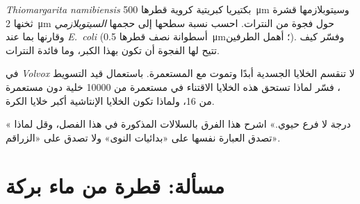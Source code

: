 \begin{exercise}[$\star\star\star$]\label{exo:b2:unicellular-diversity:10}
\emph{Thiomargarita namibiensis} بكتيريا كبريتية كروية قطرها
\qty{500}{\micro m} وسيتوبلازمها قشرة ثخنها \qty{2}{\micro m} حول
فجوة من النترات. احسب نسبة سطحها إلى حجمها \emph{السيتوبلازمي}
وقارنها بما عند \emph{E.~coli} (أسطوانة نصف قطرها \qty{0.5}{\micro m}؛
أهمل الطرفين). وفسّر كيف تتيح لها الفجوة أن تكون بهذا الكبر، وما
فائدة النترات.
\end{exercise}

\begin{exercise}[$\star\star\star$]\label{exo:b2:unicellular-diversity:11}
في \emph{Volvox} لا تنقسم الخلايا الجسدية أبدًا وتموت مع المستعمرة.
باستعمال قيد التسويط ، فسّر لماذا تستحق هذه الخلايا
الاقتناء في مستعمرة من \num{10000} خلية دون مستعمرة من 16، ولماذا
تكون الخلايا الإنتاشية أكبر خلايا الكرة.
\end{exercise}

\begin{exercise}[$\star\star\star$]\label{exo:b2:unicellular-diversity:12}
« درجة لا فرع حيوي.» اشرح هذا الفرق بالسلالات المذكورة في
هذا الفصل، وقل لماذا تصدق العبارة نفسها على «بدائيات النوى» ولا
تصدق على «الزراقم».
\end{exercise}

\section{مسألة: قطرة من ماء بركة}

